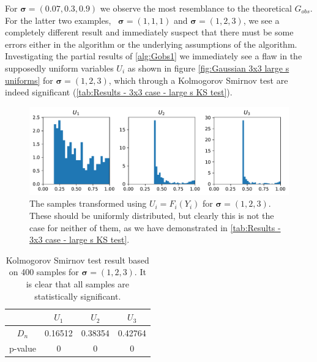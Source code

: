 \documentclass[../Thesis.tex]{subfiles}
\begin{document}
For $\boldsymbol\sigma = (0.07, 0.3, 0.9)$ we observe the most resemblance to the theoretical $G_{obs}$. For the latter two examples,  $\boldsymbol\sigma = (1,1,1)$ and $\boldsymbol\sigma = (1,2,3)$, we see a completely different result and immediately suspect that there must be some errors either in the algorithm or the underlying assumptions of the algorithm. Investigating the partial results of \autoref{alg:Gobs1} we immediately see a flaw in the supposedly uniform variables $U_i$ as shown in figure \autoref{fig:Gaussian 3x3 large s uniforms} for $\boldsymbol\sigma = (1,2,3)$, which through a Kolmogorov Smirnov test are indeed significant (\autoref{tab:Results - 3x3 case - large s KS test}).
\begin{figure}[H]
    \centering
    \includegraphics[width=0.99\linewidth]{figures/ND examples/Gaussian 3x3 large s uniforms.pdf}
    \caption{The samples transformed using $U_i = F_i(Y_i)$ for $\boldsymbol\sigma = (1,2,3)$. These should be uniformly distributed, but clearly this is not the case for neither of them, as we have demonstrated in \autoref{tab:Results - 3x3 case - large s KS test}.}
    \label{fig:Gaussian 3x3 large s uniforms}
\end{figure}
\begin{table}[ht]
    \centering
    \begin{tabular}{c|c|c|c}
                & $U_1$   & $U_2$   & $U_3$   \\\hline
        $D_n$   & 0.16512 & 0.38354 & 0.42764 \\
        p-value & 0       & 0       & 0
    \end{tabular}
    \caption{Kolmogorov Smirnov test result based on 400 samples for $\boldsymbol\sigma = (1, 2, 3)$. It is clear that all samples are statistically significant.}
    \label{tab:Results - 3x3 case - large s KS test}
\end{table}


\end{document}
